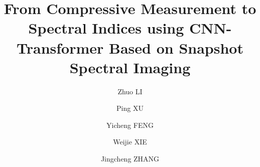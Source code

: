 \documentclass[preprint,review,12pt]{elsarticle}
\begin{document}
\begin{frontmatter}



\title{From Compressive Measurement to Spectral Indices using CNN-Transformer Based on Snapshot Spectral Imaging}


\author[1]{Zhuo LI}

\author[1]{Ping XU}

\author[1]{Yicheng FENG}

\author[1]{Weijie XIE}

\author[1]{Jingcheng ZHANG }

\address[1]{Hangzhou Dianzi University, Hangzhou, China}



\end{frontmatter}
\end{document}
